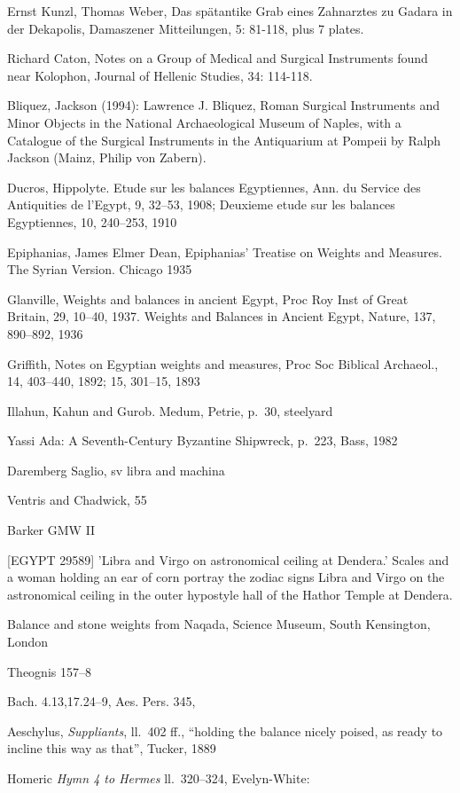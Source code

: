 \documentclass{article}
\begin{document}
Ernst Kunzl, Thomas Weber, Das sp\"atantike Grab eines Zahnarztes zu Gadara in der Dekapolis, Damaszener Mitteilungen, 5: 81-118, plus 7 plates.

Richard Caton, Notes on a Group of Medical and Surgical Instruments found near Kolophon, Journal of Hellenic Studies, 34: 114-118.

Bliquez, Jackson (1994): Lawrence J. Bliquez, Roman Surgical Instruments and Minor Objects in the National Archaeological Museum of Naples, with a Catalogue of the Surgical Instruments in the Antiquarium at Pompeii by Ralph Jackson (Mainz, Philip von Zabern).

Ducros, Hippolyte. Etude sur les balances Egyptiennes, Ann. du Service des Antiquities de l'Egypt, 9, 32--53, 1908;
Deuxieme etude sur les balances Egyptiennes, 10, 240--253, 1910

Epiphanias, James Elmer Dean, Epiphanias' Treatise on Weights and Measures. The Syrian Version. Chicago 1935

Glanville, Weights and balances in ancient Egypt, Proc Roy Inst of Great Britain, 29, 10--40, 1937. Weights and Balances in Ancient Egypt, Nature, 137, 890--892, 1936

Griffith, Notes on Egyptian weights and measures, Proc Soc Biblical Archaeol., 14, 403--440, 1892; 15, 301--15, 1893

Illahun, Kahun and Gurob. Medum, Petrie, p.~30, steelyard

Yassi Ada: A Seventh-Century Byzantine Shipwreck, p.~223, Bass, 1982

Daremberg Saglio, sv libra and machina

Ventris and Chadwick, 55

Barker GMW II

[EGYPT 29589] 'Libra and Virgo on astronomical ceiling at Dendera.' Scales and a woman holding an ear of corn portray the zodiac signs Libra and Virgo on the astronomical ceiling in the outer hypostyle hall of the Hathor Temple at Dendera. 

Balance and stone weights from Naqada, Science Museum, South Kensington, London


Theognis 157--8

Bach. 4.13,17.24--9, Aes. Pers. 345, 

Aeschylus, {\em Suppliants}, ll.~402 ff., ``holding the balance nicely poised, as ready to incline this
way as that'', Tucker, 1889

Homeric {\em Hymn 4 to Hermes} ll.~320--324, Evelyn-White:
\end{document}
